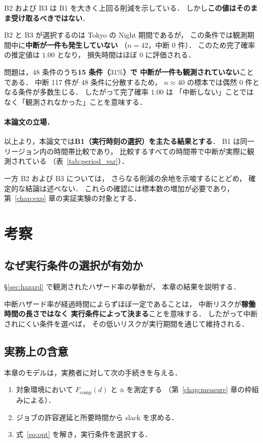 \documentclass[11pt,a4paper]{ltjsreport}
\newcommand{\Fcomp}{F_{\mathrm{comp}}}
\begin{document}
B2 および B3 は B1 を大きく上回る削減を示している．
しかし\textbf{この値はそのまま受け取るべきではない}．

B2 と B3 が選択するのは Tokyo の Night 期間であるが，
この条件では観測期間中に\textbf{中断が一件も発生していない}
（$n = 42$，中断 0 件）．
このため完了確率の推定値は $1.00$ となり，
損失時間はほぼ $0$ に評価される．

問題は，48 条件のうち\textbf{15 条件（$31\%$）で
中断が一件も観測されていない}ことである．
中断 117 件が 48 条件に分散するため，
$n \approx 40$ の標本では偶然 0 件となる条件が多数生じる．
したがって完了確率 $1.00$ は
「中断しない」ことではなく「観測されなかった」ことを意味する．

\paragraph{本論文の立場．}
以上より，本論文では\textbf{B1（実行時刻の選択）を主たる結果とする}．
B1 は同一リージョン内の時間帯比較であり，
比較するすべての時間帯で中断が実際に観測されている
（表~\ref{tab:period_var}）．

一方 B2 および B3 については，
さらなる削減の余地を示唆するにとどめ，
確定的な結論は述べない．
これらの確認には標本数の増加が必要であり，
第~\ref{chap:exp} 章の実証実験の対象とする．

\section{考察}

\subsection{なぜ実行条件の選択が有効か}

\S\ref{sec:hazard} で観測されたハザード率の挙動が，
本章の結果を説明する．

中断ハザード率が経過時間によらずほぼ一定であることは，
中断リスクが\textbf{稼働時間の長さではなく
実行条件によって決まる}ことを意味する．
したがって中断されにくい条件を選べば，
その低いリスクが実行期間を通じて維持される．

\subsection{実務上の含意}

本章のモデルは，実務者に対して次の手続きを与える．

\begin{enumerate}
  \item 対象環境において $\Fcomp(d)$ と $\bar u$ を測定する
        （第~\ref{chap:measure} 章の枠組みによる）．
  \item ジョブの許容遅延と所要時間から slack を求める．
  \item 式~\eqref{eq:opt} を解き，実行条件を選択する．
\end{enumerate}
\end{document}
